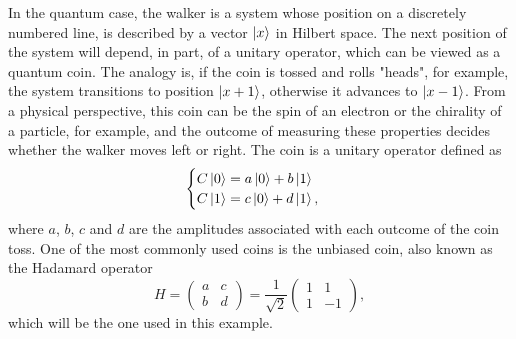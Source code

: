\documentclass[../../dissertation.tex]{subfiles}
\begin{document}
In the quantum case, the walker is a system whose position on a
discretely numbered line, is described by a vector $\ket{x}$ in Hilbert space.
The next position of the system will depend, in part, of a unitary operator,
which can be viewed as a quantum coin.
The analogy is, if the coin is tossed and rolls "heads", for example, the
system transitions to position $\ket{x+1}$, otherwise it advances to
$\ket{x-1}$. From a physical perspective, this coin can be the spin of an
electron or the chirality of a particle, for example, and the outcome of
measuring these properties decides whether the walker moves left or right. The
coin is a unitary operator defined as
\begin{equation}
	\begin{cases}
		C\ket{0} = a\ket{0} + b\ket{1}\\
		C\ket{1} = c\ket{0} + d\ket{1},
	\end{cases}
\end{equation}
where $a$, $b$, $c$ and $d$ are the amplitudes associated with each outcome of
the coin toss. One of the most commonly used coins is the unbiased coin, also
known as the Hadamard operator
\begin{equation}
	H = \begin{pmatrix} 
		a & c\\
		b & d
	    \end{pmatrix}
	    =\frac{1}{\sqrt{2}} \begin{pmatrix}
			    		1 & 1\\
					1 & -1
	   		       \end{pmatrix},
\end{equation}
which will be the one used in this example.\par 
\end{document}
